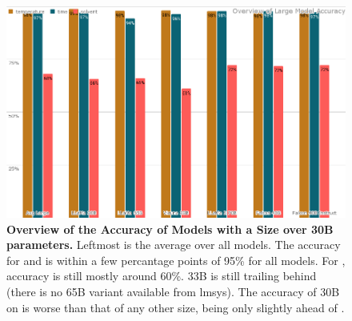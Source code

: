 \begin{figure}[!htbp]
    \begin{centering}
        \includegraphics[width=\textwidth]{img/overview_large_accuracy}
        \caption[Overview of Large Model Accuracy]{\textbf{Overview of the Accuracy of Models with a Size over 30B parameters.}
        Leftmost is the average over all models.
        The accuracy for \ttemp and \ttime is within a few percantage points of 95\% for all models.
        For \tsolv, accuracy is still mostly around 60\%.  33B is still trailing behind (there is no  65B variant available from \gls{lmsys}).
        The accuracy of  30B on \tsolv is worse than that of any other  size, being only slightly ahead of .
        }
        \label{fig:large_acc}
    \end{centering}
\end{figure}

